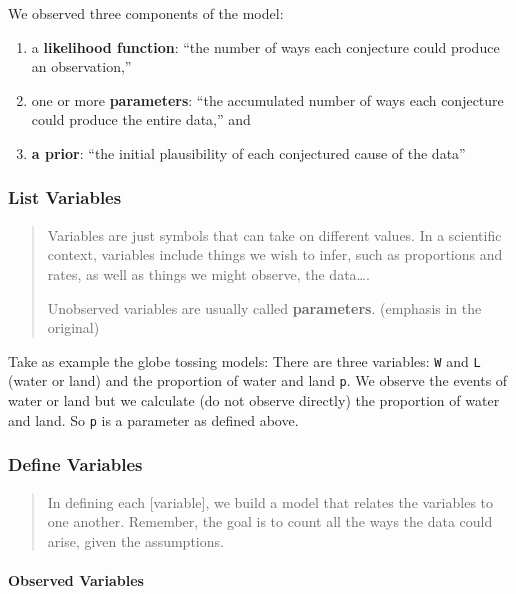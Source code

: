 \documentclass[
  letterpaper,
  DIV=11,
  numbers=noendperiod]{scrreprt}
\let\oldparagraph\paragraph
\renewcommand{\paragraph}[1]{\oldparagraph{#1}\mbox{}}
\begin{document}
We observed three components of the model:

\begin{enumerate}
\def\labelenumi{\arabic{enumi}.}
\item
  a \textbf{likelihood function}: ``the number of ways each conjecture
  could produce an observation,''
\item
  one or more \textbf{parameters}: ``the accumulated number of ways each
  conjecture could produce the entire data,'' and
\item
  \textbf{a prior}: ``the initial plausibility of each conjectured cause
  of the data''
\end{enumerate}

\hypertarget{list-variables}{%
\subsubsection{List Variables}\label{list-variables}}

\begin{quote}
Variables are just symbols that can take on different values. In a
scientific context, variables include things we wish to infer, such as
proportions and rates, as well as things we might observe, the
data\ldots.

Unobserved variables are usually called \textbf{parameters}. (emphasis
in the original)
\end{quote}

Take as example the globe tossing models: There are three variables:
\texttt{W} and \texttt{L} (water or land) and the proportion of water
and land \texttt{p}. We observe the events of water or land but we
calculate (do not observe directly) the proportion of water and land. So
\texttt{p} is a parameter as defined above.

\hypertarget{define-variables}{%
\subsubsection{Define Variables}\label{define-variables}}

\begin{quote}
In defining each {[}variable{]}, we build a model that relates the
variables to one another. Remember, the goal is to count all the ways
the data could arise, given the assumptions.
\end{quote}

\hypertarget{observed-variables}{%
\paragraph{Observed Variables}\label{observed-variables}}
\end{document}
